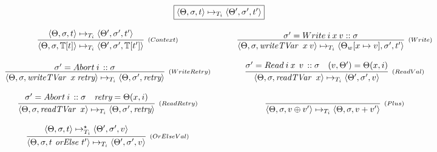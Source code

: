 \documentclass{jfp1}
\newcommand{\Read}{\textit{readTVar }}
\newcommand{\Write}{\textit{writeTVar }}
\newcommand{\Retry}{\textit{retry}}
\newcommand{\OrElse}{\textit{ orElse }}
\newcommand{\EvalCtxTran}[1]{\ensuremath{\mathbb{T}[#1]}}
\newcommand{\TStep}[9]{\ensuremath{\langle  #2, #3, #4 \rangle
    \mapsto_{T_{#5}} \langle  #7, #8, #9 \rangle}}
\newcommand{\TStepClos}[9]{\ensuremath{\langle #2, #3, #4 \rangle
    \mapsto^{\star}_{T_{#5}} \langle #7, #8, #9 \rangle}}
\begin{document}
     \begin{figure}[h]
         \[
             \begin{array}{c}
                  \fbox{$\TStep{h}{\Theta}{\sigma}{t}{i}{h'}{\Theta'}{\sigma'}{t'}$} \\
                   \\
                  \begin{array}{ccc}
                      \infer[_{(Context)}]
                              {\TStep{h}{\Theta}{\sigma}{\EvalCtxTran{t}}{i}{h'}{\Theta'}{\sigma'}{\EvalCtxTran{t'}}}
                              {\TStep{h}{\Theta}{\sigma}{t}{i}{h'}{\Theta'}{\sigma'}{t'}} & \:\:\:\:\: & 
                     \infer[_{(Write)}]
                              {\TStep{h}{\Theta}{\sigma}{\Write\:x\:v}{i}{h}{\Theta_{w}[x
                                                                                                         \mapsto
                                                                                                         v]}{\sigma'}{t'}}
                              {\sigma' = Write\:i\:x\:v :: \sigma} \\ \\
                    \infer[_{(WriteRetry)}]    
                             {\TStep{h}{\Theta}{\sigma}{\Write\:x\:\Retry}{i}{h}{\Theta}{\sigma'}{\Retry}}
                             {\sigma' = Abort\:i\, :: \sigma} & &                     
                    \infer[_{(ReadVal)}]
                             {\TStep{h}{\Theta}{\sigma}{\Read\:x}{i}{h}{\Theta'}{\sigma'}{v}}
                             {\sigma' = Read\:i\:x\:\:v \,:: \sigma & 
                              (v,\Theta') = \Theta(x,i) } \\ \\
                    \infer[_{(ReadRetry)}]    
                             {\TStep{h}{\Theta}{\sigma}{\Read\:x}{i}{h}{\Theta}{\sigma'}{\Retry}}
                             {\sigma' = Abort\:i\, :: \sigma & 
                              \Retry = \Theta(x,i)}  & &
                    \infer[_{(Plus)}]
                             {\TStep{h}{\Theta}{\sigma}{v \oplus
                                                         v'}{i}{h}{\Theta}{\sigma}{v
                                                       + v'}}
                             {} \\ \\
                    \infer[_{(OrElseVal)}]
                             {\TStep{h}{\Theta}{\sigma}{t \OrElse t'}{i}{h'}{\Theta'}{\sigma'}{v}}
                             {\TStepClos{h}{\Theta}{\sigma}{t}{i}{h}{\Theta'}{\sigma'}{v}}

\end{array}
\end{array}\]
\end{figure}
\end{document}
